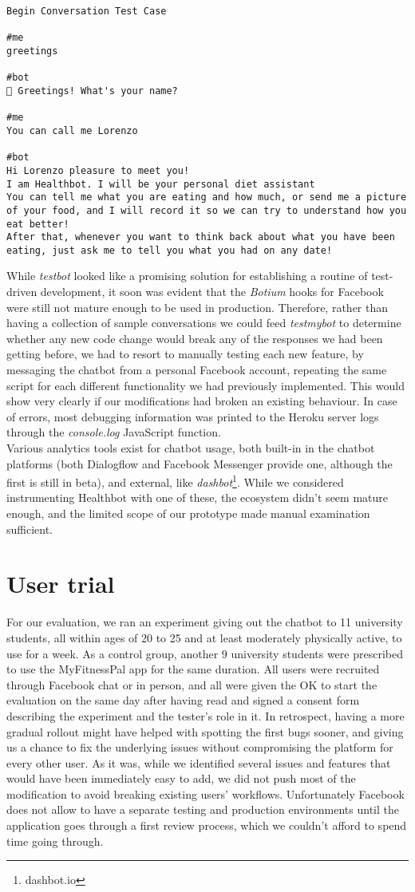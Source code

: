 \begin{lstlisting}
Begin Conversation Test Case

#me
greetings

#bot
👋 Greetings! What's your name?

#me
You can call me Lorenzo

#bot
Hi Lorenzo pleasure to meet you!
I am Healthbot. I will be your personal diet assistant
You can tell me what you are eating and how much, or send me a picture of your food, and I will record it so we can try to understand how you eat better!
After that, whenever you want to think back about what you have been eating, just ask me to tell you what you had on any date!
\end{lstlisting}
While \textit{testbot} looked like a promising solution for establishing a routine of test-driven development, it soon was evident that the \textit{Botium} hooks for Facebook were still not mature enough to be used in production. Therefore, rather than having a collection of sample conversations we could feed \textit{testmybot} to determine whether any new code change would break any of the responses we had been getting before, we had to resort to manually testing each new feature, by messaging the chatbot from a personal Facebook account, repeating the same script for each different functionality we had previously implemented. This would show very clearly if our modifications had broken an existing behaviour. In case of errors, most debugging information was printed to the Heroku server logs through the \textit{console.log} JavaScript function. \\
Various analytics tools exist for chatbot usage, both built-in in the chatbot platforms (both Dialogflow and Facebook Messenger provide one, although the first is still in beta), and external, like \textit{dashbot}\footnote{dashbot.io}. While we considered instrumenting Healthbot with one of these, the ecosystem didn't seem mature enough, and the limited scope of our prototype made manual examination sufficient.
\section{User trial}
For our evaluation, we ran an experiment giving out the chatbot to 11 university students, all within ages of 20 to 25 and at least moderately physically active, to use for a week. As a control group, another 9 university students were prescribed to use the MyFitnessPal app for the same duration. All users were recruited through Facebook chat or in person, and all were given the OK to start the evaluation on the same day after having read and signed a consent form describing the experiment and the tester's role in it. In retrospect, having a more gradual rollout might have helped with spotting the first bugs sooner, and giving us a chance to fix the underlying issues without compromising the platform for every other user. As it was, while we identified several issues and features that would have been immediately easy to add, we did not push most of the modification to avoid breaking existing users' workflows. Unfortunately Facebook does not allow to have a separate testing and production environments until the application goes through a first review process, which we couldn't afford to spend time going through.

